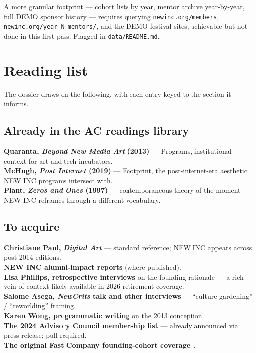 \documentclass[10pt,letterpaper,twocolumn]{article}
\begin{document}
A more granular footprint --- cohort lists by year, mentor archive year-by-year, full DEMO sponsor history --- requires querying \texttt{newinc.org/members}, \texttt{newinc.org/year-N-mentors/}, and the DEMO festival sites; achievable but not done in this first pass. Flagged in \texttt{data/README.md}.

\section{Reading list}

The dossier draws on the following, with each entry keyed to the section it informs.

\subsection{Already in the AC readings library}

\textbf{Quaranta, \emph{Beyond New Media Art} (2013)} --- Programs, institutional context for art-and-tech incubators.\\
\textbf{McHugh, \emph{Post Internet} (2019)} --- Footprint, the post-internet-era aesthetic NEW INC programs intersect with.\\
\textbf{Plant, \emph{Zeros and Ones} (1997)} --- contemporaneous theory of the moment NEW INC reframes through a different vocabulary.

\subsection{To acquire}

\textbf{Christiane Paul, \emph{Digital Art}} --- standard reference; NEW INC appears across post-2014 editions.\\
\textbf{NEW INC alumni-impact reports} (where published).\\
\textbf{Lisa Phillips, retrospective interviews} on the founding rationale --- a rich vein of context likely available in 2026 retirement coverage.\\
\textbf{Salome Asega, \emph{NewCrits} talk and other interviews} --- ``culture gardening'' / ``reworlding'' framing.\\
\textbf{Karen Wong, programmatic writing} on the 2013 conception.\\
\textbf{The 2024 Advisory Council membership list} --- already announced via press release; pull required.\\
\textbf{The original Fast Company founding-cohort coverage}~\citep{fastcompany2014newinc}.
\end{document}
